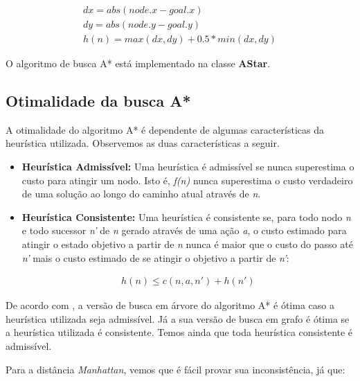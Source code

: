 \documentclass[12pt]{article}
\begin{document}
\begin{itemize}
	\begin{align*}
		dx = abs(node.x - goal.x) \\
		dy = abs(node.y - goal.y) \\
		h(n) = max(dx, dy) + 0.5 * min(dx, dy)
	\end{align*}

	O algoritmo de busca A* está implementado na classe \textbf{AStar}.

\end{itemize}

\subsection{Otimalidade da busca A*}

A otimalidade do algoritmo A* é dependente de algumas características da heurística utilizada. Observemos as duas características a seguir.

\begin{itemize}
	\item \textbf{Heurística Admissível:} Uma heurística é admissível se nunca superestima o custo para atingir um nodo. Isto é, \textit{f(n)} nunca superestima o custo verdadeiro de uma solução ao longo do caminho atual através de \textit{n}.

	\item \textbf{Heurística Consistente:} Uma heurística é consistente se, para todo nodo \textit{n} e todo sucessor \textit{n'} de \textit{n} gerado através de uma ação \textit{a}, o custo estimado para atingir o estado objetivo a partir de \textit{n} nunca é maior que o custo do passo até \textit{n'} mais o custo estimado de se atingir o objetivo a partir de \textit{n'}:

	\begin{align*}
		h(n) \leq c(n, a, n') + h(n')
	\end{align*}

\end{itemize}

De acordo com \cite{russell2016artificial}, a versão de busca em árvore do algoritmo A* é ótima caso a heurística utilizada seja admissível. Já a sua versão de busca em grafo é ótima se a heurística utilizada é consistente. Temos ainda que toda heurística consistente é admissível.


Para a distância \textit{Manhattan}, vemos que é fácil provar sua inconsistência, já que:
\end{document}
